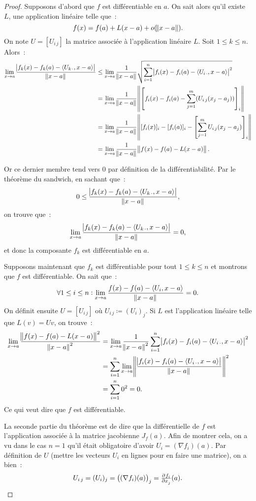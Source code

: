 \documentclass{article}
\newcommand{\scpr}[2]{{\left\langle#1, #2\right\rangle}}
\theoremstyle{definition}
\theoremstyle{remark}
\begin{document}
		\begin{proof} Supposons d'abord que $f$ est différentiable en $a$. On sait alors qu'il existe $L$, une application linéaire telle que~:
		\[f(x) = f(a) + L(x-a) + o(\norm{x-a}).\]
		On note $U = [U_{i\,j}]$ la matrice associée à l'application linéaire $L$. Soit $1 \leq k \leq n$. Alors~:
		\begin{align*}
			\lim_{x \to a}\frac {\abs {f_k(x)-f_k(a) - \scpr {U_{k\,\cdot}}{x-a}}}{\norm{x-a}}
			&\leq \lim_{x \to a} \frac 1{\norm{x-a}}\sqrt{\sum_{i=1}^n\abs {f_i(x)-f_i(a)-\scpr{U_{i\,\cdot}}{x-a}}^2} \\
			&= \lim_{x \to a}\frac 1{\norm{x-a}}\norm{\left[f_i(x)-f_i(a)-\sum_{j=1}^m(U_{i\,j}(x_j-a_j))\right]_i} \\
			&= \lim_{x \to a}\frac 1{\norm{x-a}}\norm{[f_i(x)]_i - [f_i(a)]_i - \left[\sum_{j=1}^mU_{i\,j}(x_j-a_j)\right]_i} \\
			&= \lim_{x \to a}\frac 1{\norm{x-a}}\norm{f(x)-f(a)-L(x-a)}.
		\end{align*}

		Or ce dernier membre tend vers 0 par définition de la différentiabilité. Par le théorème du sandwich, en sachant que~:
		\[0 \leq \frac {\abs {f_k(x)-f_k(a) - \scpr {U_{k\,\cdot}}{x-a}}}{\norm{x-a}},\]
		on trouve que~:
		\[\lim_{x \to a}\frac {\abs{f_k(x)-f_k(a)-\scpr{U_{k\,\cdot}}{x-a}}}{\norm{x-a}} = 0,\]
		et donc la composante $f_k$ est différentiable en $a$.

		Supposons maintenant que $f_k$ est différentiable pour tout $1 \leq k \leq n$ et montrons que $f$ est différentiable. On sait que~:
		\[\forall 1 \leq i \leq n : \lim_{x \to a}\frac {f(x)-f(a)-\scpr{U_i}{x-a}}{\norm{x-a}} = 0.\]
		On définit ensuite $U = [U_{i\,j}]$ où $U_{i\,j} \coloneqq (U_i)_j$. Si $L$ est l'application linéaire telle que $L(v) = Uv$, on trouve~:
		\begin{align*}
			\lim_{x \to a}\frac {\norm{f(x)-f(a)-L(x-a)}^2}{\norm{x-a}^2}
			&= \lim_{x \to a}\frac 1{\norm{x-a}^2}\sum_{i=1}^n\abs {f_i(x)-f_i(a)-\scpr{U_{i\,\cdot}}{x-a}}^2 \\
			&= \sum_{i=1}^n\lim_{x \to a}\norm{\frac {\abs{f_i(x)-f_i(a) - \scpr{U_{i\,\cdot}}{x-a}}}{\norm{x-a}}}^2 \\
			&= \sum_{i=1}^n0^2 = 0.
		\end{align*}
		Ce qui veut dire que $f$ est différentiable.

		La seconde partie du théorème est de dire que la différentielle de $f$ est l'application associée à la matrice jacobienne $J_f(a)$.
		Afin de montrer cela, on a vu dans le cas $n=1$ qu'il était obligatoire d'avoir $U_i = (\nabla f_i)(a)$. Par définition de $U$ (mettre les vecteurs
		$U_i$ en lignes pour en faire une matrice), on a bien~:
		\[U_{i\,j} = (U_i)_j = \left((\nabla f_i)(a)\right)_j = \pd {f_i}{x_j}(a).\]
		\end{proof}
\end{document}
